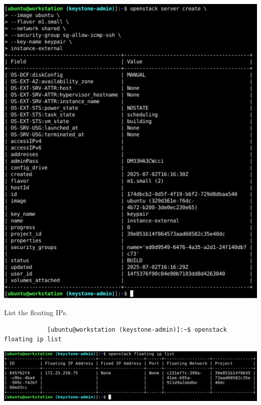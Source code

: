 \documentclass[letterpaper, 12pt]{article}
\begin{document}
\begin{enumerate}
\begin{labstep}
        \begin{center}
            \includegraphics[width=\linewidth]{images/part5/step34.png}
        \end{center}
    \end{labstep}

    \begin{labstep}
        List the floating IPs.
        \begin{lstlisting}
            [ubuntu@workstation (keystone-admin)]:~$ openstack floating ip list
        \end{lstlisting}

        \begin{center}
            \includegraphics[width=\linewidth]{images/part5/step35.png}
        \end{center}
    \end{labstep}


\end{enumerate}
\end{document}
